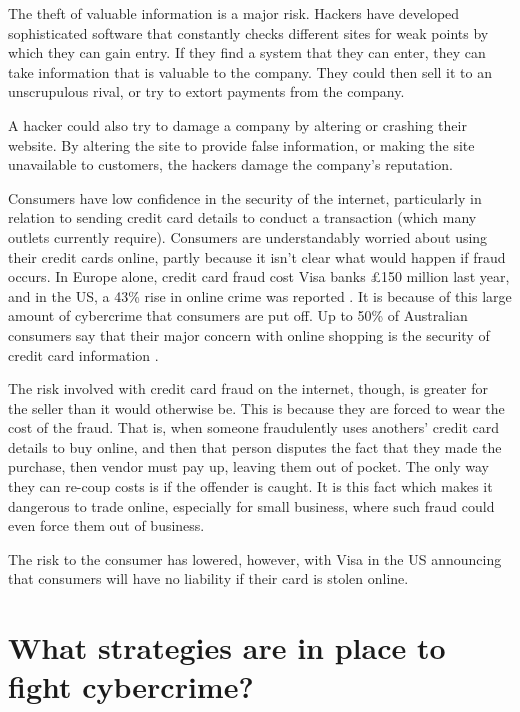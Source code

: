 \documentclass[11pt,a4paper,twoside,notitlepage]{article}
\begin{document}
 The theft of valuable information is a major risk.  Hackers have developed sophisticated 
 software that constantly checks different sites for weak points by which they can
 gain entry.  If they find a system that they can enter, they can take information
 that is valuable to the company.  They could then sell it to an unscrupulous rival,
 or try to extort payments from the company.

 A hacker could also try to damage a company by altering or crashing their website.
 By altering the site to provide false information, or making the site unavailable to
 customers, the hackers damage the company's reputation.

 Consumers have low confidence in the security of the internet, particularly in relation
 to sending credit card details to conduct a transaction (which many outlets currently
 require).  Consumers are understandably worried about using their credit cards online,
 partly because it isn't clear what would happen if fraud occurs\cite{Sinclair:Age00}.
 In Europe alone, credit card fraud cost Visa banks \pounds 150 million last
 year, and in the US, a 43\% rise in online crime was reported \cite{August:Comp00}.
 It is because of this large amount of cybercrime that consumers are put off.
 Up to 50\% of Australian consumers say that their major concern with online shopping
 is the security of credit card information \cite{anon:ABF00}.  
 
 The risk involved with credit card fraud on the internet, though, is greater for
 the seller than it would otherwise be.  This is because they are forced to wear
 the cost of the fraud.  That is, when someone fraudulently uses anothers' 
 credit card details to buy online, and then that person disputes the fact that
 they made the purchase, then vendor must pay up, leaving them out of pocket.  
 The only way they can re-coup costs is if the offender is caught.  It is this fact
 which makes it dangerous to trade online, especially for small business, where 
 such fraud could even force them out of business.

 The risk to the consumer has lowered, however, with Visa in the US announcing that
 consumers will have no liability if their card is stolen online\cite{Sinclair:Age00}.  
  


\section*{What strategies are in place to fight cybercrime?}
\end{document}
